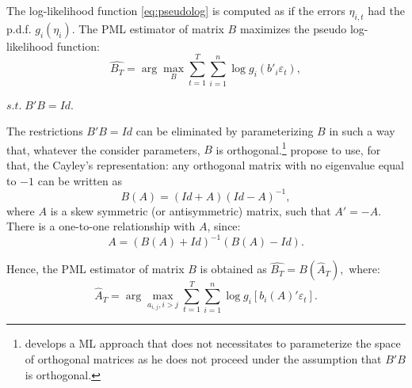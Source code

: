 \documentclass[
  12pt,
]{book}
\theoremstyle{definition}
\theoremstyle{definition}
\theoremstyle{definition}
\theoremstyle{definition}
\theoremstyle{remark}
\begin{document}
The log-likelihood function \eqref{eq:pseudolog} is computed as if the errors \(\eta_{i,t}\) had the p.d.f. \(g_i (\eta_i)\). The PML estimator of matrix \(B\) maximizes the pseudo log-likelihood function:
\begin{equation}
\widehat{B_T} = \arg \max_B \sum^T_{t=1} \sum^n_{i=1} \log g_i (b'_i \varepsilon_t),\label{eq:optimprob}
\end{equation}

\centerline{$s.t. \;B'B = Id.$}

The restrictions \(B'B = Id\) can be eliminated by parameterizing \(B\) in such a way that, whatever the consider parameters, \(B\) is orthogonal.\footnote{\citet{Jarocinski_2021} develops a ML approach that does not necessitates to parameterize the space of orthogonal matrices as he does not proceed under the assumption that \(B'B\) is orthogonal.} \citet{Gourieroux_Monfort_Renne_2017} propose to use, for that, the Cayley's representation: any orthogonal matrix with no eigenvalue equal to \(-1\) can be written as
\begin{equation}
B(A) = (Id+A) (Id-A)^{-1},
\end{equation}
where \(A\) is a skew symmetric (or antisymmetric) matrix, such that \(A'=-A\). There is a one-to-one relationship with \(A\), since:
\begin{equation}
A = (B(A)+Id)^{-1} (B(A)-Id).
\end{equation}

Hence, the PML estimator of matrix \(B\) is obtained as \(\widehat{B_T} = B(\hat{A}_T),\) where:
\begin{equation}
\hat{A}_T = \arg \max_{a_{i,j}, i>j} \sum^T_{t=1} \sum^n_{i=1} \log g_i [b_i (A)' \varepsilon_t].\label{eq:optimprob2}
\end{equation}
\end{document}
